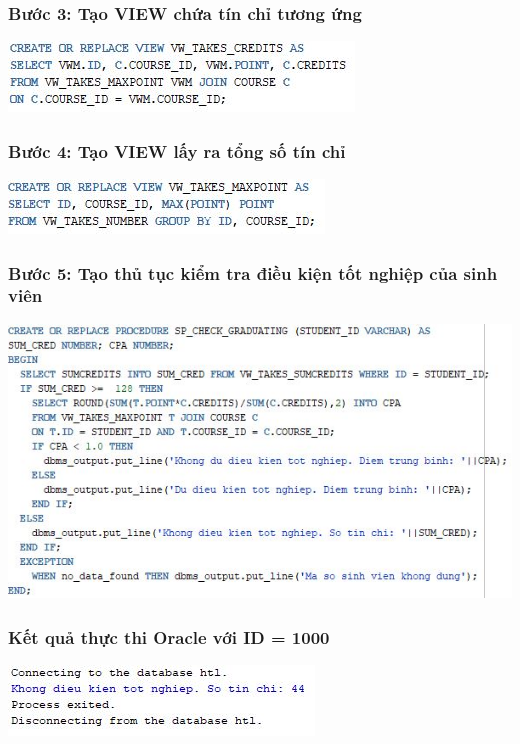 \documentclass[12pt,a4paper]{report}
\begin{document}
\subsubsection{Bước 3: Tạo VIEW chứa tín chỉ tương ứng} 
\includegraphics[scale=1]{b1v3.jpg}
\subsubsection{Bước 4: Tạo VIEW lấy ra tổng số tín chỉ} 
\includegraphics[scale=1]{b1v2.jpg}
\subsubsection{Bước 5: Tạo thủ tục kiểm tra điều kiện tốt nghiệp của sinh viên} 
\includegraphics[scale=1]{b1o.jpg}
\subsubsection{Kết quả thực thi Oracle với ID = 1000}
\includegraphics[scale=1]{kb1o.jpg}
\end{document}
